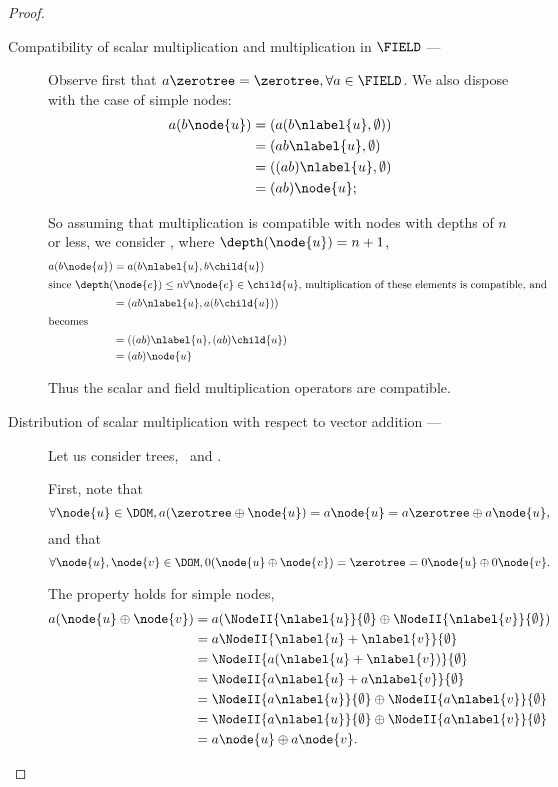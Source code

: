 \begin{definition}
\begin{proposition}
\begin{proof}
\begin{description}
    \item[Compatibility of scalar multiplication and multiplication in
      $\FIELD$ --- ]

      Observe first that $a \zerotree = \zerotree, \forall a \in
      \FIELD$. We also dispose with the case of simple nodes:
      \begin{align}
        a(b \node{u}) &= (a(b \nlabel{u}, \emptyset)) \\
        &= (a b \nlabel{u}, \emptyset) \\
        &= ((a b) \nlabel{u}, \emptyset) \\
        &= (a b) \node{u};
      \end{align}

      So assuming that multiplication is compatible with nodes with
      depths of $n$ or less, we consider , where $\depth(\node{u})
      = n+1$,
      \begin{align}
        a (b \node{u}) &= a (b  \nlabel{u}, b\child{u}) \\
        \intertext{since $\depth(\node{e}) \leq n \forall \node{e}\in \child{u},$ multiplication of these elements is compatible, and }
        &= (a b\/ \nlabel{u}, a(b\child{u})) \\
        \intertext{becomes}
        &= ((a b) \nlabel{u}, (a b)\child{u}) \\
        &= (a b) \node{u}
      \end{align}

      Thus the scalar and field multiplication operators are compatible.

    \item[Distribution of scalar multiplication with respect to vector addition --- ]

      Let us consider trees, \ and .

      First, note that \[\forall \node{u} \in \DOM, a(\zerotree \oplus \node{u}) = a \node{u} = a\zerotree \oplus a \node{u},\]
      and that \[\forall \node{u},\node{v}\in\DOM, 0 (\node{u} \oplus \node{v}) = \zerotree = 0 \node{u} \oplus 0 \node{v}.\]

      The property holds for simple nodes, 
      \begin{align}
        a(\node{u} \oplus \node{v}) &= a (\NodeII{\nlabel{u}}{\emptyset} \oplus \NodeII{\nlabel{v}}{\emptyset})\\ 
        &= a \NodeII{\nlabel{u} + {\nlabel{v}}}{\emptyset} \\
        &= \NodeII{a(\nlabel{u}+\nlabel{v})}{\emptyset} \\
        &= \NodeII{a\nlabel{u} + a\nlabel{v}}{\emptyset} \\
        &= \NodeII{a\nlabel{u}}{\emptyset} \oplus \NodeII{a\nlabel{v}}{\emptyset} \\
        &= \NodeII{a\nlabel{u}}{\emptyset} \oplus \NodeII{a\nlabel{v}}{\emptyset} \\
        &= a \node{u} \oplus a \node{v}.
      \end{align}


\end{description}
\end{proof}
\end{proposition}
\end{definition}
